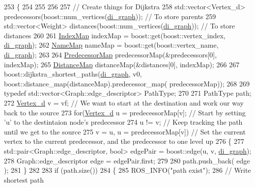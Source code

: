 \begin{DoxyCode}
253                                                       \{
254     
255 
256 
257     \textcolor{comment}{// Create things for Dijkstra}
258     std::vector<Vertex\_d> predecessors(boost::num\_vertices(\hyperlink{class_preplanner_af588e8495d5e78dd5a746f7c640daa4d}{di\_graph})); \textcolor{comment}{// To store parents}
259     std::vector<Weight> distances(boost::num\_vertices(\hyperlink{class_preplanner_af588e8495d5e78dd5a746f7c640daa4d}{di\_graph})); \textcolor{comment}{// To store distances}
260 
261     \hyperlink{_common_8h_a7fb6309a04472de0c8cb8c74ebf92c5e}{IndexMap} indexMap = boost::get(boost::vertex\_index, \hyperlink{class_preplanner_af588e8495d5e78dd5a746f7c640daa4d}{di\_graph});
262     \hyperlink{_common_8h_a7a347729377841627777cbe0a6becbf9}{NameMap} nameMap = boost::get(boost::vertex\_name, \hyperlink{class_preplanner_af588e8495d5e78dd5a746f7c640daa4d}{di\_graph});
263 
264     \hyperlink{_common_8h_a3e372f12838999c89bb6fafe2c9b4363}{PredecessorMap} predecessorMap(&predecessors[0], indexMap);
265     \hyperlink{_common_8h_acab893c91ba1c4e4415b652ccebeea6a}{DistanceMap} distanceMap(&distances[0], indexMap);    
266 
267     boost::dijkstra\_shortest\_paths(\hyperlink{class_preplanner_af588e8495d5e78dd5a746f7c640daa4d}{di\_graph}, v0, boost::distance\_map(distanceMap).predecessor\_map(
      predecessorMap));
268 
269     \textcolor{keyword}{typedef} std::vector<Graph::edge\_descriptor> PathType;
270 
271     PathType path;
272     \hyperlink{_common_8h_a1f671d518f573b692b5efa57ed576f36}{Vertex\_d} v = vf; \textcolor{comment}{// We want to start at the destination and work our way back to the source}
273     \textcolor{keywordflow}{for}(\hyperlink{_common_8h_a1f671d518f573b692b5efa57ed576f36}{Vertex\_d} u = predecessorMap[v]; \textcolor{comment}{// Start by setting 'u' to the destintaion node's
       predecessor}
274         u != v; \textcolor{comment}{// Keep tracking the path until we get to the source}
275         v = u, u = predecessorMap[v]) \textcolor{comment}{// Set the current vertex to the current predecessor, and the
       predecessor to one level up}
276     \{
277         std::pair<Graph::edge\_descriptor, bool> edgePair = boost::edge(u, v, 
      \hyperlink{class_preplanner_af588e8495d5e78dd5a746f7c640daa4d}{di\_graph});
278         Graph::edge\_descriptor edge = edgePair.first;
279 
280         path.push\_back( edge );
281     \}
282 
283     \textcolor{keywordflow}{if} (path.size())
284     \{
285        ROS\_INFO(\textcolor{stringliteral}{"path exist"});
286         \textcolor{comment}{// Write shortest path}

\end{DoxyCode}
